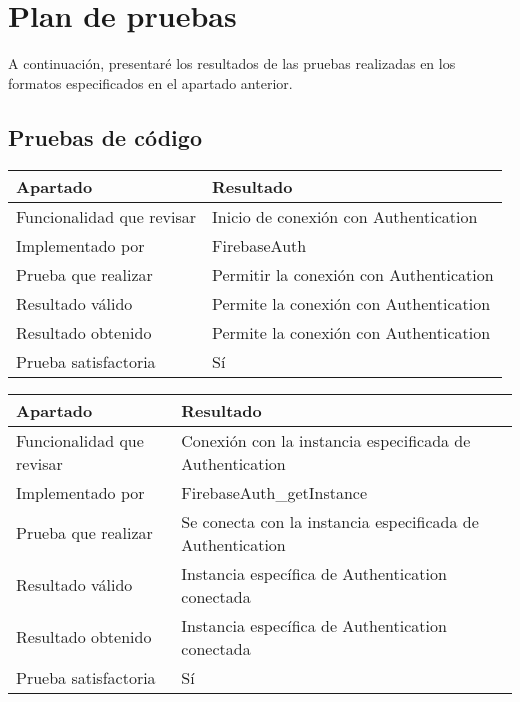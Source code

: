\chapter{Plan de pruebas}\label{cap:plan pruebas}

A continuación, presentaré los resultados de las pruebas realizadas en los formatos especificados en el apartado anterior.

\section{Pruebas de código}

\begin{center}
    \begin{tabulary}{0.8\textwidth}{L|L}
        \textbf{Apartado} & \textbf{Resultado} \\ \hline
        Funcionalidad que revisar & Inicio de conexión con Authentication \\
        Implementado por & FirebaseAuth \\
        Prueba que realizar & Permitir la conexión con Authentication \\
        Resultado válido & Permite la conexión con Authentication \\
        Resultado obtenido & Permite la conexión con Authentication \\
        Prueba satisfactoria & Sí \\
    \end{tabulary} 
\end{center}

\bigskip

\begin{center}
    \begin{tabulary}{0.8\textwidth}{L|L}
        \textbf{Apartado} & \textbf{Resultado} \\ \hline
        Funcionalidad que revisar & Conexión con la instancia especificada de Authentication \\
        Implementado por & FirebaseAuth\_getInstance \\
        Prueba que realizar & Se conecta con la instancia especificada de Authentication \\
        Resultado válido & Instancia específica de Authentication conectada \\
        Resultado obtenido & Instancia específica de Authentication conectada \\
        Prueba satisfactoria & Sí \\
    \end{tabulary} 
\end{center}

